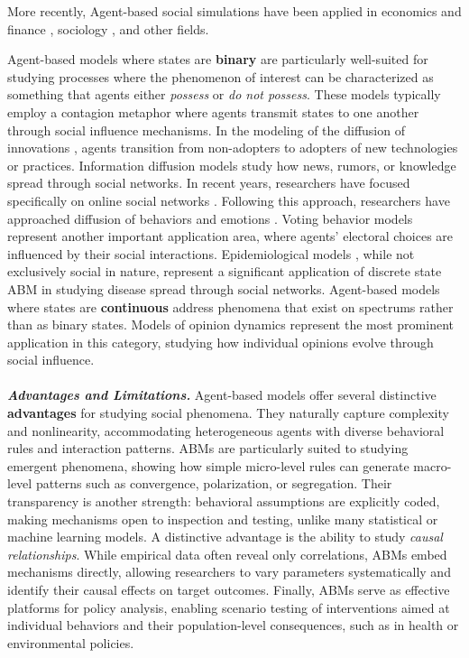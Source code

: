 \documentclass[11pt]{article}
\begin{document}
More recently, Agent-based social simulations have been applied in economics and finance \cite{axtell2025agent}, sociology \cite{bianchi2015agent}, and other fields.

\noindent Agent-based models where states are \textbf{binary} are particularly well-suited for studying processes where the phenomenon of interest can be characterized as something that agents either \textit{possess} or \textit{do not possess}. 
These models typically employ a contagion metaphor where agents transmit states to one another through social influence mechanisms. 
In the modeling of the diffusion of innovations \cite{kiesling2012agent}, agents transition from non-adopters to adopters of new technologies or practices. 
Information diffusion \cite{zhang2019empirically} models study how news, rumors, or knowledge spread through social networks. 
In recent years, researchers have focused specifically on online social networks \cite{guille2013information}. 
Following this approach, researchers have approached diffusion of behaviors \cite{prabhakaran2023improving} and emotions \cite{van2023emotion}. 
Voting behavior models \cite{holley1975ergodic} represent another important application area, where agents' electoral choices are influenced by their social interactions.
Epidemiological models \cite{lorig2021agent}, while not exclusively social in nature, represent a significant application of discrete state ABM in studying disease spread through social networks.
Agent-based models where states are \textbf{continuous} address phenomena that exist on spectrums rather than as binary states. Models of opinion dynamics \cite{sirbu2016opinion} represent the most prominent application in this category, studying how individual opinions evolve through social influence. 
\\ \ \\
\textbf{\textit{Advantages and Limitations.}}
Agent-based models offer several distinctive \textbf{advantages} for studying social phenomena. 
They naturally capture complexity and nonlinearity, accommodating heterogeneous agents with diverse behavioral rules and interaction patterns. 
ABMs are particularly suited to studying emergent phenomena, showing how simple micro-level rules can generate macro-level patterns such as convergence, polarization, or segregation. 
Their transparency is another strength: behavioral assumptions are explicitly coded, making mechanisms open to inspection and testing, unlike many statistical or machine learning models. 
A distinctive advantage is the ability to study \textit{causal relationships}. 
While empirical data often reveal only correlations, ABMs embed mechanisms directly, allowing researchers to vary parameters systematically and identify their causal effects on target outcomes. 
Finally, ABMs serve as effective platforms for policy analysis, enabling scenario testing of interventions aimed at individual behaviors and their population-level consequences, such as in health or environmental policies.  
\smallskip \noindent
\end{document}
